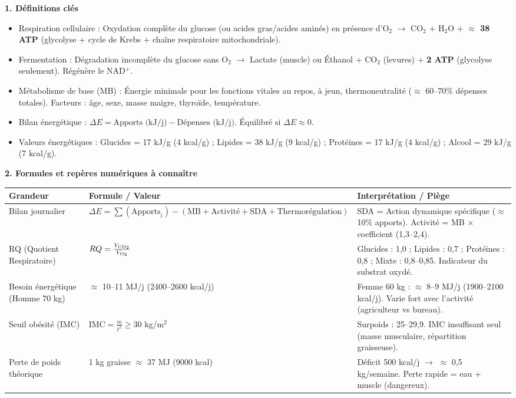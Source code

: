 \documentclass[11pt]{article}
\newcommand{\cle}[1]{{\popxbold\color{popdark}#1}}
\begin{document}
\begin{bilan}
\textbf{1. Définitions clés}
\begin{itemize}
    \item \cle{Respiration cellulaire} : Oxydation complète du glucose (ou acides gras/acides aminés) en présence d'O$_2$ $\rightarrow$ CO$_2$ + H$_2$O + \textbf{$\approx$ 38 ATP} (glycolyse + cycle de Krebs + chaîne respiratoire mitochondriale).
    \item \cle{Fermentation} : Dégradation incomplète du glucose sans O$_2$ $\rightarrow$ Lactate (muscle) ou Éthanol + CO$_2$ (levures) + \textbf{2 ATP} (glycolyse seulement). Régénère le NAD$^+$.
    \item \cle{Métabolisme de base (MB)} : Énergie minimale pour les fonctions vitales au repos, à jeun, thermoneutralité ($\approx$ 60--70\% dépenses totales). Facteurs : âge, sexe, masse maigre, thyroïde, température.
    \item \cle{Bilan énergétique} : $\Delta E = \text{Apports (kJ/j)} - \text{Dépenses (kJ/j)}$. Équilibré si $\Delta E \approx 0$.
    \item \cle{Valeurs énergétiques} : Glucides = 17 kJ/g (4 kcal/g) ; Lipides = 38 kJ/g (9 kcal/g) ; Protéines = 17 kJ/g (4 kcal/g) ; Alcool = 29 kJ/g (7 kcal/g).
\end{itemize}

\textbf{2. Formules et repères numériques à connaître}
\begin{center}
\begin{tabularx}{\linewidth}{|l|X|X|}\hline
\rowcolor{popblueL}
\textbf{Grandeur} & \textbf{Formule / Valeur} & \textbf{Interprétation / Piège} \\ \hline
Bilan journalier & $\Delta E = \sum(\text{Apports}_i) - (\text{MB} + \text{Activité} + \text{SDA} + \text{Thermorégulation})$ & SDA = Action dynamique spécifique ($\approx$ 10\% apports). Activité = MB $\times$ coefficient (1,3--2,4). \\ \hline
RQ (Quotient Respiratoire) & $RQ = \frac{V_{\ce{CO2}}}{V_{\ce{O2}}}$ & Glucides : 1,0 ; Lipides : 0,7 ; Protéines : 0,8 ; Mixte : 0,8--0,85. Indicateur du substrat oxydé. \\ \hline
Besoin énergétique (Homme 70 kg) & $\approx$ 10--11 MJ/j (2400--2600 kcal/j) & Femme 60 kg : $\approx$ 8--9 MJ/j (1900--2100 kcal/j). Varie fort avec l'activité (agriculteur vs bureau). \\ \hline
Seuil obésité (IMC) & $\text{IMC} = \frac{m}{t^2} \ge 30$ kg/m$^2$ & Surpoids : 25--29,9. IMC insuffisant seul (masse musculaire, répartition graisseuse). \\ \hline
Perte de poids théorique & 1 kg graisse $\approx$ 37 MJ (9000 kcal) & Déficit 500 kcal/j $\rightarrow$ $\approx$ 0,5 kg/semaine. Perte rapide = eau + muscle (dangereux). \\ \hline
\end{tabularx}
\end{center}


\end{bilan}
\end{document}
